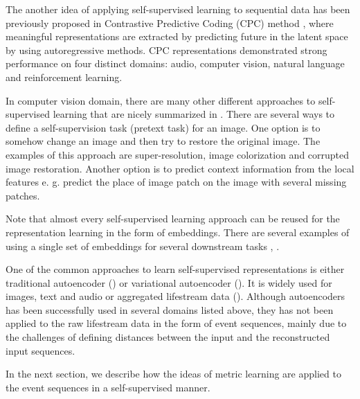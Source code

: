\documentclass[sigconf, anonymous]{acmart}
\begin{document}
The another idea of applying self-supervised learning to sequential data has been previously proposed in Contrastive Predictive Coding (CPC) method \cite{DBLP:journals/corr/abs-1807-03748}, where meaningful representations are extracted by predicting future in the latent space by using autoregressive methods. CPC representations demonstrated strong performance on four distinct domains: audio, computer vision, natural language and reinforcement learning. 

In computer vision domain, there are many other different approaches to self-supervised learning that are nicely summarized in \cite{jing2019selfsupervised}. There are several ways to define a self-supervision task (pretext task) for an image. One option is to somehow change an image and then try to restore the original image. The examples of this approach are super-resolution, image colorization and corrupted image restoration. Another option is to predict context information from the local features e. g. predict the place of image patch on the image with several missing patches.

Note that almost every self-supervised learning approach can be reused for the representation learning in the form of embeddings. There are several examples of using a single set of embeddings for several downstream tasks \cite{Song2017LearningUE}, \cite{Zhai:2019:LUE:3292500.3330739}.


One of the common approaches to learn self-supervised representations is either traditional autoencoder (\cite{rumelhart1985learning}) or variational autoencoder (\cite{kingma2013auto}). It is widely used for images, text and audio or aggregated lifestream data (\cite{mancisidor2019learning}). Although autoencoders has been successfully used in several domains listed above, they has not been applied to the raw lifestream data in the form of event sequences, mainly due to the challenges of defining distances between the input and the reconstructed input sequences.

In the next section, we describe how the ideas of metric learning are applied to the event sequences in a self-supervised manner.
\end{document}
